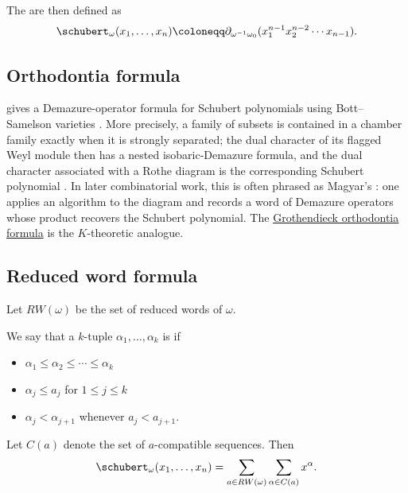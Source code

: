 The  are then defined as
\begin{equation*}
 \schubert_\omega(x_1,\dotsc,x_n)
 \coloneqq
 \partial_{\omega^{-1}\omega_0}(x_1^{n-1}x_2^{n-2}\dotsm x_{n-1}).
\end{equation*}


\subsection[schubertOrthodontia]{Orthodontia formula}

 gives a Demazure-operator formula for Schubert
polynomials using Bott--Samelson varieties
\cite{Magyar1998SchubertBottSamelson}.  More precisely, a family of subsets is
contained in a chamber family exactly when it is strongly separated; the dual
character of its flagged Weyl module then has a nested isobaric-Demazure
formula, and the dual character associated with a Rothe diagram is the
corresponding Schubert polynomial
\cite[Prop.~5, Prop.~10, Thm.~14]{Magyar1998SchubertBottSamelson}.  In later
combinatorial work, this is often phrased as Magyar's
: one applies an algorithm to the diagram and
records a word of Demazure operators whose product recovers the Schubert
polynomial.  The
\hyperref[grothendieckOrthodontia]{Grothendieck orthodontia formula} is the
$K$-theoretic analogue.


\subsection[schubertReducedwordFormula]{Reduced word formula}
Let $RW(\omega)$ be the set of reduced words of $\omega$.

We say that a $k$-tuple $\alpha_1,\dotsc,\alpha_k$ is
\label{aCompatibleSequence}
if
\begin{itemize}
\item
$\alpha_1 \leq \alpha_2 \leq \dotsb \leq \alpha_k$
\item
$\alpha_j \leq a_j$ for $1 \leq j \leq k$
\item
$\alpha_j \lt \alpha_{j+1}$ whenever $a_j \lt a_{j+1}$.
\end{itemize}
Let $C(a)$ denote the set of $a$-compatible sequences.
Then
\begin{equation*}
 \schubert_\omega(x_1,\dotsc,x_n) = \sum_{a \in RW(\omega)} \sum_{\alpha \in C(a)}
 x^\alpha .
\end{equation*}



